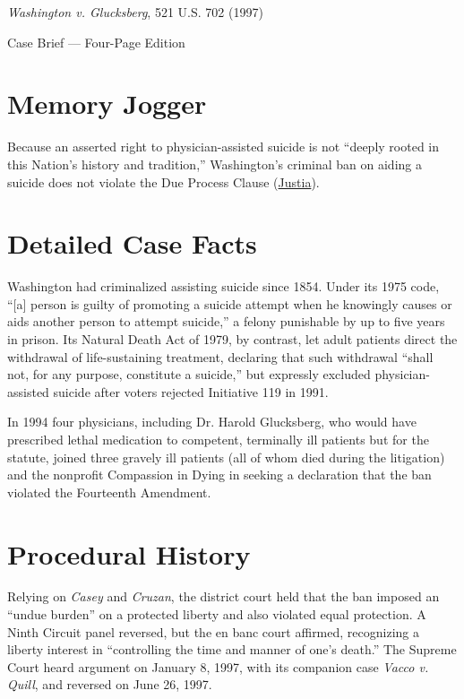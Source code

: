\documentclass[12pt]{article}
\begin{document}
\begin{center}
{\LARGE \textit{Washington v. Glucksberg}, 521 U.S. 702 (1997)\par}
\vspace{0.8em}
{\large Case Brief --- Four-Page Edition\par}
\end{center}
\vspace{1em}

\section{Memory Jogger}

Because an asserted right to physician-assisted suicide is not ``deeply rooted in this Nation's history and tradition,'' Washington's criminal ban on aiding a suicide does not violate the Due Process Clause (\href{https://supreme.justia.com/cases/federal/us/521/702/}{Justia}).

\section{Detailed Case Facts}

Washington had criminalized assisting suicide since 1854. Under its 1975 code, ``[a] person is guilty of promoting a suicide attempt when he knowingly causes or aids another person to attempt suicide,'' a felony punishable by up to five years in prison. Its Natural Death Act of 1979, by contrast, let adult patients direct the withdrawal of life-sustaining treatment, declaring that such withdrawal ``shall not, for any purpose, constitute a suicide,'' but expressly excluded physician-assisted suicide after voters rejected Initiative 119 in 1991.

In 1994 four physicians, including Dr. Harold Glucksberg, who would have prescribed lethal medication to competent, terminally ill patients but for the statute, joined three gravely ill patients (all of whom died during the litigation) and the nonprofit Compassion in Dying in seeking a declaration that the ban violated the Fourteenth Amendment.

\section{Procedural History}

Relying on \textit{Casey} and \textit{Cruzan}, the district court held that the ban imposed an ``undue burden'' on a protected liberty and also violated equal protection. A Ninth Circuit panel reversed, but the en banc court affirmed, recognizing a liberty interest in ``controlling the time and manner of one's death.'' The Supreme Court heard argument on January 8, 1997, with its companion case \textit{Vacco v. Quill}, and reversed on June 26, 1997.
\end{document}
